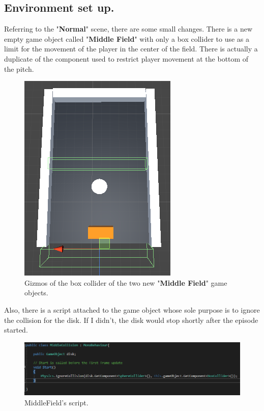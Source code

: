 \documentclass[12pt]{article}
\begin{document}
	\subsection{Environment set up.}
	
	Referring to the "\textbf{Normal}" scene, there are some small changes. There is a new empty game object called "\textbf{Middle Field}" with only a box collider to use as a limit for the movement of the player in the center of the field. There is actually a duplicate of the component used to restrict player movement at the bottom of the pitch.
	
	 \begin{figure}[hbt!]
	 	\centering
	 	\includegraphics[width= 0.59
	 	\textwidth]{images/MiddleField.png}
	 	\caption{Gizmos of the box collider of the two new "\textbf{Middle Field}" game objects.}
	 \end{figure}
	
	\noindent
	Also, there is a script attached to the game object whose sole purpose is to ignore the collision for the disk. If I didn't, the disk would stop shortly after the episode started.
	
	\begin{figure}[hbt!]
		\centering
		\includegraphics[width= 1
		\textwidth]{images/MiddleCollisionCode.png}
		\caption{MiddleField's script.}
	\end{figure}
	
\end{document}
